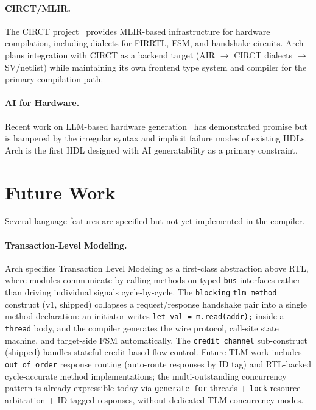 \documentclass[11pt,twocolumn]{article}
\begin{document}
\paragraph{CIRCT/MLIR.}
The CIRCT project~\cite{circt} provides MLIR-based infrastructure for hardware compilation, including dialects for FIRRTL, FSM, and handshake circuits. Arch plans integration with CIRCT as a backend target (AIR $\to$ CIRCT dialects $\to$ SV/netlist) while maintaining its own frontend type system and compiler for the primary compilation path.

\paragraph{AI for Hardware.}
Recent work on LLM-based hardware generation~\cite{thakur2023verigen,liu2023chipnemo,blocklove2023chip} has demonstrated promise but is hampered by the irregular syntax and implicit failure modes of existing HDLs. Arch is the first HDL designed with AI generatability as a primary constraint.

\section{Future Work}\label{sec:future}

Several language features are specified but not yet implemented in the compiler.

\paragraph{Transaction-Level Modeling.}
Arch specifies Transaction Level Modeling as a first-class abstraction above RTL, where modules communicate by calling methods on typed \texttt{bus} interfaces rather than driving individual signals cycle-by-cycle. The \texttt{blocking} \texttt{tlm\_method} construct (v1, shipped) collapses a request/response handshake pair into a single method declaration: an initiator writes \texttt{let val = m.read(addr);} inside a \texttt{thread} body, and the compiler generates the wire protocol, call-site state machine, and target-side FSM automatically. The \texttt{credit\_channel} sub-construct (shipped) handles stateful credit-based flow control. Future TLM work includes \texttt{out\_of\_order} response routing (auto-route responses by ID tag) and RTL-backed cycle-accurate method implementations; the multi-outstanding concurrency pattern is already expressible today via \texttt{generate for} threads + \texttt{lock} resource arbitration + ID-tagged responses, without dedicated TLM concurrency modes.
\end{document}

